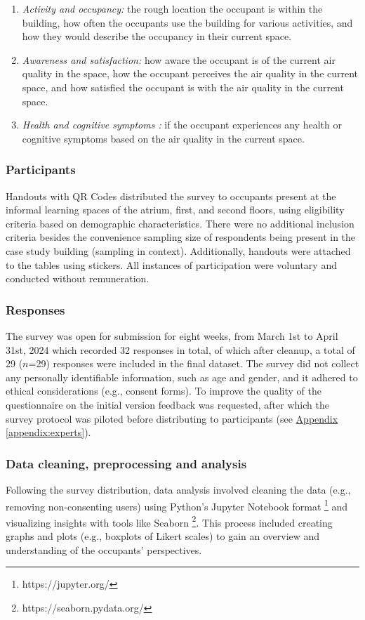 \begin{enumerate}
  \item \textit{Activity and occupancy:} the rough location the occupant is within the building, how often the occupants use the building for various activities, and how they would describe the occupancy in their current space.
  \item \textit{Awareness and satisfaction:} how aware the occupant is of the current air quality in the space, how the occupant perceives the air quality in the current space, and how satisfied the occupant is with the air quality in the current space.
  \item \textit{Health and cognitive symptoms :} if the occupant experiences any health or cognitive symptoms based on the air quality in the current space.
\end{enumerate}


\subsubsection{Participants}
Handouts with QR Codes distributed the survey to occupants present at the informal learning spaces of the atrium, first, and second floors, using eligibility criteria based on demographic characteristics. There were no additional inclusion criteria besides the convenience sampling size of respondents being present in the case study building (sampling in context). Additionally, handouts were attached to the tables using stickers. All instances of participation were voluntary and conducted without remuneration. 

\subsubsection{Responses}
The survey was open for submission for eight weeks, from March 1st to April 31st, 2024 which recorded 32 responses in total, of which after cleanup, a total of 29 ($n$=29) responses were included in the final dataset. The survey did not collect any personally identifiable information, such as age and gender, and it adhered to ethical considerations (e.g., consent forms). To improve the quality of the questionnaire on the initial version feedback was requested, after which the survey protocol was piloted before
distributing to participants (see \hyperref[appendix:experts]{Appendix \ref*{appendix:experts}}). 

\subsubsection{Data cleaning, preprocessing and analysis}
\label{sec:analysis}
Following the survey distribution, data analysis involved cleaning the data (e.g., removing non-consenting users) using Python's  Jupyter Notebook format \footnote{https://jupyter.org/} and visualizing insights with tools like Seaborn \footnote{https://seaborn.pydata.org/}.  This process included creating graphs and plots (e.g., boxplots of Likert scales) to gain an overview and understanding of the occupants' perspectives.

